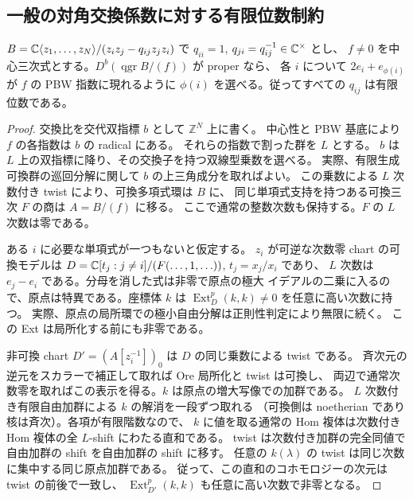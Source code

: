 \subsection{一般の対角交換係数に対する有限位数制約}
\label{nds:sec:support}
\begin{proposition}\label{nds:prop:support}
$B=\mathbb C\langle z_1,\ldots,z_N\rangle/(z_i z_j-q_{ij} z_j z_i)$ で
$q_{ii}=1$, $q_{ji}=q_{ij}^{-1}\in\mathbb C^\times$ とし、
$f\ne0$ を中心三次式とする。$D^b(\operatorname{qgr} B/(f))$ が proper なら、
各 $i$ について $2e_i+e_{\phi(i)}$ が $f$ の PBW 指数に現れるように
$\phi(i)$ を選べる。従ってすべての $q_{ij}$ は有限位数である。
\end{proposition}
\begin{proof}
交換比を交代双指標 $b$ として $\mathbb Z^N$ 上に書く。
中心性と PBW 基底により $f$ の各指数は $b$ の radical にある。
それらの指数で割った群を $L$ とする。
$b$ は $L$ 上の双指標に降り、その交換子を持つ双線型乗数を選べる。
実際、有限生成可換群の巡回分解に関して $b$ の上三角成分を取ればよい。
この乗数による $L$ 次数付き twist により、可換多項式環は $B$ に、
同じ単項式支持を持つある可換三次 $F$ の商は $A=B/(f)$ に移る。
ここで通常の整数次数も保持する。$F$ の $L$ 次数は零である。

ある $i$ に必要な単項式が一つもないと仮定する。
$z_i$ が可逆な次数零 chart の可換モデルは
$D=\mathbb C[t_j:j\ne i]/(F(\ldots,1,\ldots))$, $t_j=x_j/x_i$ であり、
$L$ 次数は $e_j-e_i$ である。分母を消した式は非零で原点の極大
イデアルの二乗に入るので、原点は特異である。座標体 $k$ は
$\operatorname{Ext}_D^p(k,k)\ne0$ を任意に高い次数に持つ。
実際、原点の局所環での極小自由分解は正則性判定により無限に続く。
この Ext は局所化する前にも非零である。

非可換 chart $D'=(A[z_i^{-1}])_0$ は $D$ の同じ乗数による twist である。
斉次元の逆元をスカラーで補正して取れば Ore 局所化と twist は可換し、
両辺で通常次数零を取ればこの表示を得る。$k$ は原点の増大写像での加群である。
$L$ 次数付き有限自由加群による $k$ の解消を一段ずつ取れる
（可換側は noetherian であり核は斉次）。各項が有限階数なので、
$k$ に値を取る通常の Hom 複体は次数付き Hom 複体の全 $L$-shift にわたる直和である。
twist は次数付き加群の完全同値で自由加群の shift を自由加群の shift に移す。
任意の $k(\lambda)$ の twist は同じ次数に集中する同じ原点加群である。
従って、この直和のコホモロジーの次元は twist の前後で一致し、
$\operatorname{Ext}_{D'}^p(k,k)$ も任意に高い次数で非零となる。


\end{proof}
